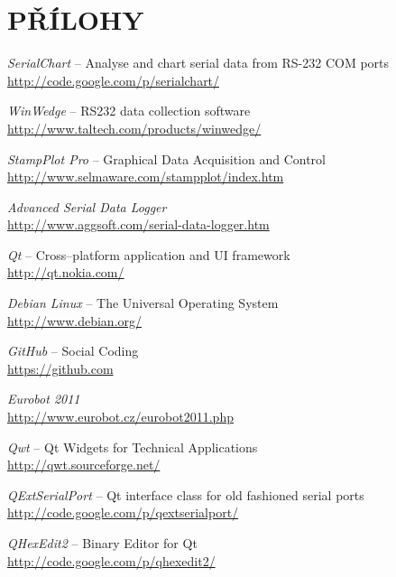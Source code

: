 \documentclass[12pt, a4paper, oneside]{article}
\newcommand{\It}{\textit}  %
\begin{document}
\section*{PŘÍLOHY}

 \begin{thebibliography}{99}

     \It{SerialChart} -- Analyse and chart serial data from RS-232 COM ports \\
    \url{http://code.google.com/p/serialchart/}

     \It{WinWedge} -- RS232 data collection software \\
    \url{http://www.taltech.com/products/winwedge/}

     \It{StampPlot Pro} -- Graphical Data Acquisition and Control \\
    \url{http://www.selmaware.com/stampplot/index.htm}

     \It{Advanced Serial Data Logger} \\
    \url{http://www.aggsoft.com/serial-data-logger.htm}

     \It{Qt} -- Cross--platform application and UI framework \\
    \url{http://qt.nokia.com/}

     \It{Debian Linux} -- The Universal Operating System \\
    \url{http://www.debian.org/}

     \It{GitHub} -- Social Coding \\
    \url{https://github.com}

     \It{Eurobot 2011} \\
    \url{http://www.eurobot.cz/eurobot2011.php}

     \It{Qwt} -- Qt Widgets for Technical Applications \\
    \url{http://qwt.sourceforge.net/}

     \It{QExtSerialPort} -- Qt interface class for old fashioned serial ports \\
    \url{http://code.google.com/p/qextserialport/}

     \It{QHexEdit2} -- Binary Editor for Qt \\
    \url{http://code.google.com/p/qhexedit2/}


\end{thebibliography}
\end{document}
